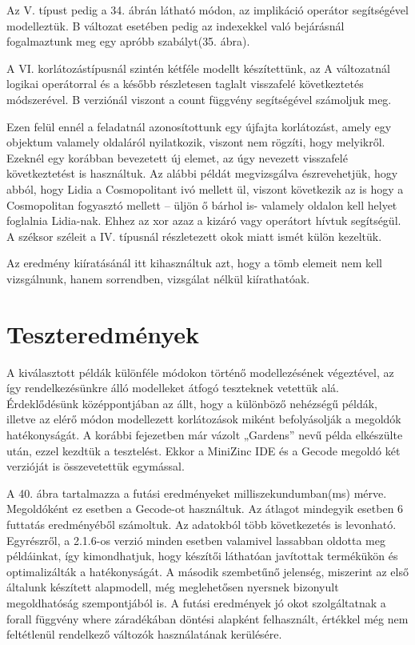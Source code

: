 \documentclass[12pt,a4paper,twoside, openright]{report}
\begin{document}

    Az V. típust pedig a 34. ábrán látható módon, az implikáció operátor segítségével modelleztük.
    B változat esetében pedig az indexekkel való bejárásnál fogalmaztunk meg egy apróbb szabályt(35. ábra).


    A VI. korlátozástípusnál szintén kétféle modellt készítettünk, az A változatnál logikai 
    operátorral és a később részletesen taglalt visszafelé következtetés módszerével.
    B 
    verziónál viszont a count függvény segítségével számoljuk meg.


    Ezen felül ennél a feladatnál azonosítottunk egy újfajta korlátozást, amely egy objektum valamely oldaláról nyilatkozik, viszont nem rögzíti, hogy melyikről.
    Ezeknél egy korábban bevezetett új elemet, az úgy nevezett visszafelé következtetést is használtuk.
    Az alábbi példát megvizsgálva észrevehetjük, hogy abból, hogy Lidia a Cosmopolitant ivó mellett ül, viszont következik az is hogy a Cosmopolitan fogyasztó mellett – üljön ő bárhol is- valamely oldalon kell helyet foglalnia Lidia-nak.
    Ehhez az xor azaz a kizáró vagy operátort hívtuk segítségül.
    A széksor széleit a IV. típusnál részletezett okok miatt ismét külön kezeltük.


    Az eredmény kiíratásánál itt kihasználtuk azt, hogy a tömb elemeit nem kell vizsgálnunk, hanem sorrendben, vizsgálat nélkül kiírathatóak.


\section{Teszteredmények}

    A kiválasztott példák különféle módokon történő modellezésének végeztével, az így rendelkezésünkre álló modelleket átfogó teszteknek vetettük alá.
    Érdeklődésünk középpontjában az állt, hogy a különböző nehézségű példák, illetve az elérő módon modellezett korlátozások miként befolyásolják a megoldók hatékonyságát.
    A korábbi fejezetben már vázolt „Gardens” nevű példa elkészülte után, ezzel kezdtük a tesztelést.
    Ekkor a MiniZinc IDE és a Gecode megoldó két verzióját is összevetettük egymással.


    A 40. ábra tartalmazza a futási eredményeket milliszekundumban(ms) mérve.
    Megoldóként ez esetben a Gecode-ot használtuk.
    Az átlagot mindegyik esetben 6 futtatás eredményéből számoltuk.
    Az adatokból több következetés is levonható.
    Egyrészről, a 2.1.6-os verzió minden esetben valamivel lassabban oldotta meg példáinkat, így kimondhatjuk, hogy készítői láthatóan javítottak termékükön és optimalizálták a hatékonyságát.
    A második szembetűnő jelenség, miszerint az első általunk készített alapmodell, még meglehetősen nyersnek bizonyult megoldhatóság szempontjából is.
    A futási eredmények jó okot szolgáltatnak a forall függvény where záradékában döntési alapként felhasznált, értékkel még nem feltétlenül rendelkező változók használatának kerülésére.
\end{document}
